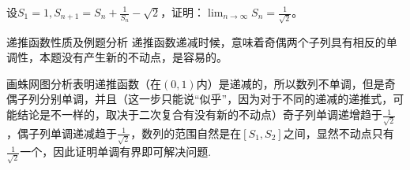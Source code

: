 \documentclass[../../main.tex]{subfiles}
\begin{document}
\begin{example}
设\(S_1 = 1,S_{n + 1}=S_n+\frac{1}{S_n}-\sqrt{2}\)，证明：\(\lim_{n\rightarrow\infty}S_n=\frac{1}{\sqrt{2}}\)。
\end{example}
\begin{note}
递推函数性质及例题分析
递推函数递减时候，意味着奇偶两个子列具有相反的单调性，本题没有产生新的不动点，是容易的。

画蛛网图分析表明递推函数（在\((0,1)\)内）是递减的，所以数列不单调，但是奇偶子列分别单调，并且（这一步只能说“似乎”，因为对于不同的递减的递推式，可能结论是不一样的，取决于二次复合有没有新的不动点）奇子列单调递增趋于\(\frac{1}{\sqrt{2}}\)，偶子列单调递减趋于\(\frac{1}{\sqrt{2}}\)，数列的范围自然是在\([S_1,S_2]\)之间，显然不动点只有\(\frac{1}{\sqrt{2}}\)一个，因此证明单调有界即可解决问题.
\end{note}
\end{document}
